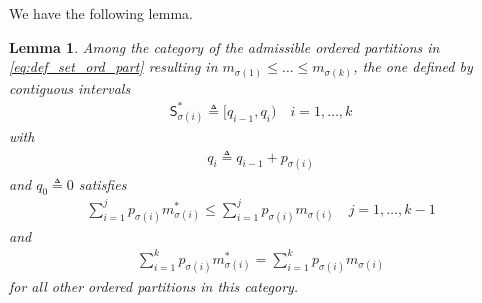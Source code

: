 \documentclass[10pt,a4paper]{amsart}
\newtheorem{lemma}{Lemma}
\def\sS{{\mathsf S}}
\def\deq{\triangleq}
\begin{document}
We have the following lemma.
\begin{lemma}\label{lm:major}
Among the category of the admissible ordered partitions in \eqref{eq:def_set_ord_part} resulting in $m_{\sigma(1)} \le \ldots \le m_{\sigma(k)}$, the one defined by contiguous intervals
\begin{align}
    \sS^*_{\sigma(i)} \deq [q_{i-1}, q_i)  \quad i=1,\ldots,k \label{eq:def_S*_q}
\end{align}
with
\begin{align}
    q_i \deq q_{i-1} + p_{\sigma(i)}
\end{align}
and $q_0 \deq 0$ satisfies
\begin{align}
    \sum_{i=1}^j p_{\sigma(i)} m^*_{\sigma(i)}
    \le
    \sum_{i=1}^j p_{\sigma(i)} m_{\sigma(i)} \quad j=1,\ldots, k-1 \label{eq:major_j}
\end{align}
and 
\begin{align}
    \sum_{i=1}^k p_{\sigma(i)} m^*_{\sigma(i)}
    =
    \sum_{i=1}^k p_{\sigma(i)} m_{\sigma(i)} \label{eq:major_k}
\end{align}
for all other ordered partitions in this category.
\end{lemma}
\end{document}
